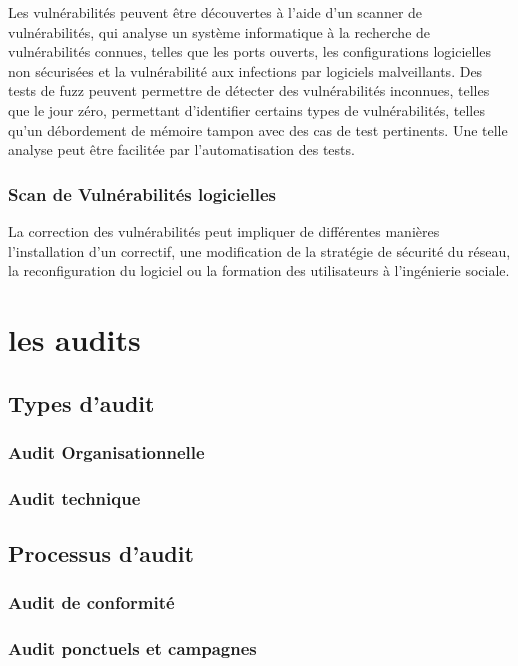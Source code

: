 Les vulnérabilités peuvent être découvertes à l'aide d'un scanner de vulnérabilités, qui analyse un système informatique à la recherche de vulnérabilités connues, telles que les ports ouverts, les configurations logicielles non sécurisées et la vulnérabilité aux infections par logiciels malveillants. Des tests de fuzz peuvent permettre de détecter des vulnérabilités inconnues, telles que le jour zéro, permettant d'identifier certains types de vulnérabilités, telles qu'un débordement de mémoire tampon avec des cas de test pertinents. Une telle analyse peut être facilitée par l’automatisation des tests. 

\subsubsection{Scan de Vulnérabilités logicielles}

La correction des vulnérabilités peut impliquer de différentes manières l’installation d’un correctif, une modification de la stratégie de sécurité du réseau, la reconfiguration du logiciel ou la formation des utilisateurs à l’ingénierie sociale.


\section{les audits}


\subsection{Types d'audit}
\subsubsection{Audit Organisationnelle}
\subsubsection{Audit technique}

\subsection{Processus d'audit}
\subsubsection{Audit de conformité}
\subsubsection{Audit ponctuels et campagnes}
